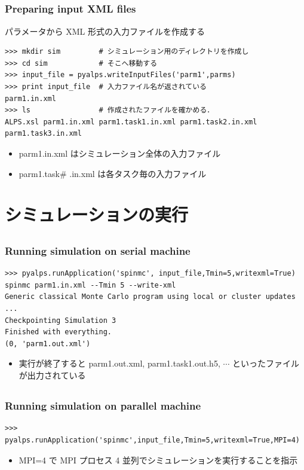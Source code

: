 \subsection*{\redm\whiteb\greenb}
\begin{frame}[t,fragile]
\frametitle{Preparing input XML files}
パラメータから XML 形式の入力ファイルを作成する
\begin{lstlisting}
>>> mkdir sim         # シミュレーション用のディレクトリを作成し
>>> cd sim            # そこへ移動する
>>> input_file = pyalps.writeInputFiles('parm1',parms)
>>> print input_file  # 入力ファイル名が返されている
parm1.in.xml
>>> ls                # 作成されたファイルを確かめる．
ALPS.xsl parm1.in.xml parm1.task1.in.xml parm1.task2.in.xml parm1.task3.in.xml
\end{lstlisting}
\begin{itemize}
 \item parm1.in.xml はシミュレーション全体の入力ファイル
 \item parm1.task\# .in.xml は各タスク毎の入力ファイル
\end{itemize}

\end{frame}

\section{シミュレーションの実行}

\subsection*{\redm\whiteb\greenb}
\begin{frame}[t,fragile]
\frametitle{Running simulation on serial machine}
\begin{lstlisting}
>>> pyalps.runApplication('spinmc', input_file,Tmin=5,writexml=True)
spinmc parm1.in.xml --Tmin 5 --write-xml
Generic classical Monte Carlo program using local or cluster updates
...
Checkpointing Simulation 3
Finished with everything.
(0, 'parm1.out.xml')
\end{lstlisting}
\begin{itemize}
\item 実行が終了すると parm1.out.xml, parm1.task1.out.h5, $\cdots$ といったファイルが出力されている
\end{itemize}
\end{frame}

\subsection*{\redm\whitem\greenb}
\begin{frame}[t,fragile]
\frametitle{Running simulation on parallel machine}
\begin{lstlisting}
>>> pyalps.runApplication('spinmc',input_file,Tmin=5,writexml=True,MPI=4)
\end{lstlisting}
\begin{itemize}
\item MPI=4 で MPI プロセス 4 並列でシミュレーションを実行することを指示
\end{itemize}
\end{frame}

